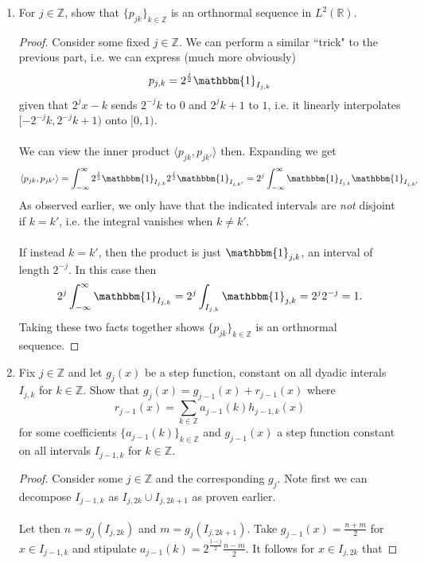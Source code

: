\documentclass[12pt]{article}
\newenvironment{ex}[2][Exercise]{\begin{trivlist}
\item[\hskip \labelsep {\bfseries #1}\hskip \labelsep {\bfseries #2.}]}{\end{trivlist}}
\begin{document}
\begin{ex}{14}
\begin{enumerate}[label=14.\arabic*]
\begin{proof}
        \end{proof}
        \item For $j \in \mathbb{Z}$, show that $\{p_{jk}\}_{k \in \mathbb{Z}}$ is an orthnormal sequence in $L^2(\mathbb{R})$. 
        \begin{proof}
            Consider some fixed $j \in \mathbb{Z}$. We can perform a similar ``trick" to the previous part, i.e. we can express (much more obviously)
            $$p_{j,k} = 2^{\frac{j}{2}}\mathbbm{1}_{I_{j,k}}$$
            given that $2^jx - k$ sends $2^{-j}k$ to $0$ and $2^{j}k + 1$ to $1$, i.e. it linearly interpolates $[-2^{-j}k, 2^{-j}k + 1)$ onto $[0,1)$. \\ \\
            We can view the inner product $\langle p_{jk}, p_{jk'} \rangle$ then. Expanding we get 
            $$\langle p_{jk}, p_{jk'} \rangle = \int_{-\infty}^\infty 2^{\frac{j}{2}}\mathbbm{1}_{I_{j,k}}2^{\frac{j}{2}}\mathbbm{1}_{I_{j,k'}} = 2^j\int_{-\infty}^\infty \mathbbm{1}_{I_{j,k}}\mathbbm{1}_{I_{j,k'}}$$
            As observed earlier, we only have that the indicated intervals are \textit{not} disjoint if $k = k'$, i.e. the integral vanishes when $k \neq k'$.  \\ \\
            If instead $k = k'$, then the product is just $\mathbbm{1}_{j,k}$, an interval of length $2^{-j}$. In this case then 
            $$2^j\int_{-\infty}^\infty \mathbbm{1}_{I_{j,k}} = 2^j\int_{I_{j,k}} \mathbbm{1}_{j,k} = 2^j2^{-j} = 1.$$
            Taking these two facts together shows $\{p_{jk}\}_{k \in \mathbb{Z}}$ is an orthnormal sequence.
        \end{proof}
        \item Fix $j \in \mathbb{Z}$ and let $g_j(x)$ be a step function, constant on all dyadic interals $I_{j,k}$ for $k \in \mathbb{Z}$. Show that $g_j(x) = g_{j - 1}(x) + r_{j - 1}(x)$ where 
        $$r_{j - 1}(x) = \sum_{k \in \mathbb{Z}} a_{j - 1}(k)h_{j - 1, k}(x)$$
        for some coefficients $\{a_{j - 1}(k)\}_{k \in \mathbb{Z}}$ and $g_{j - 1}(x)$ a step function constant on all intervals $I_{j - 1, k}$ for $k \in \mathbb{Z}$.
        \begin{proof}
            Consider some $j \in \mathbb{Z}$ and the corresponding $g_j$. Note first we can decompose $I_{j - 1, k}$ as $I_{j, 2k} \cup I_{j, 2k + 1}$ as proven earlier. \\ \\
            Let then $n = g_j(I_{j, 2k})$ and $m = g_j(I_{j, 2k + 1})$. Take $g_{j - 1}(x) = \frac{n + m}{2}$ for $x \in I_{j - 1,k}$ and stipulate $a_{j - 1}(k) = 2^{\frac{1 - j}{2}}\frac{n - m}{2}$. It follows for $x \in I_{j,2k}$ that

\end{proof}
\end{enumerate}
\end{ex}
\end{document}
